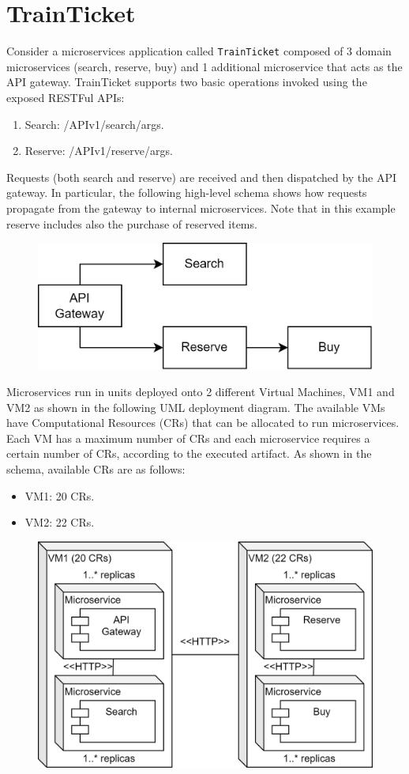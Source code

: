 \section{TrainTicket}

Consider a microservices application called \texttt{TrainTicket} composed of 3 domain microservices (search, reserve, buy) and 1 additional microservice that acts as the API gateway. 
TrainTicket supports two basic operations invoked using the exposed RESTFul APIs:
\begin{enumerate}
    \item Search: /APIv1/search/{args}.
    \item Reserve: /APIv1/reserve/{args}.
\end{enumerate}
Requests (both search and reserve) are received and then dispatched by the API gateway.
In particular, the following high-level schema shows how requests propagate from the gateway to internal microservices.
Note that in this example reserve includes also the purchase of reserved items.
\begin{figure}[H]
    \centering
    \includegraphics[width=0.5\linewidth]{images/hl.png}
\end{figure}
Microservices run in units deployed onto 2 different Virtual Machines, VM1 and VM2 as shown in the following UML deployment diagram.
The available VMs have Computational Resources (CRs) that can be allocated to run microservices.
Each VM has a maximum number of CRs and each microservice requires a certain number of CRs, according to the executed artifact. 
As shown in the schema, available CRs are as follows:
\begin{itemize}
    \item VM1: 20 CRs.
    \item VM2: 22 CRs.
\end{itemize}
\begin{figure}[H]
    \centering
    \includegraphics[width=0.75\linewidth]{images/hl1.png}
\end{figure}

